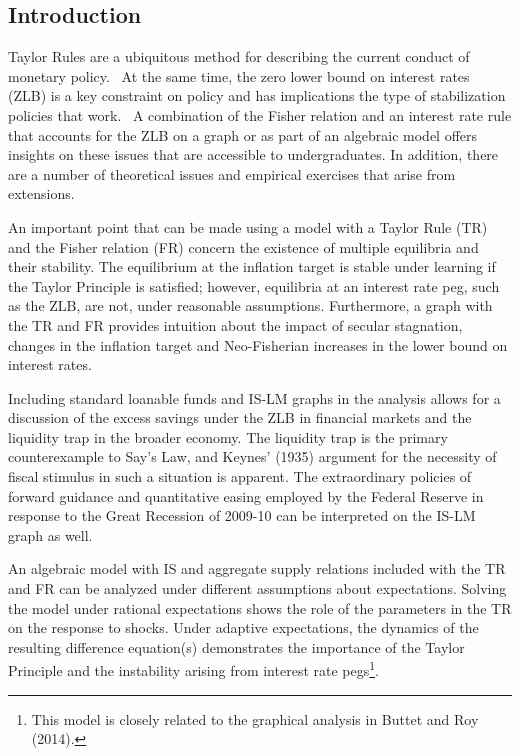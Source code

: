 \documentclass{article}
\begin{document}
\begin{doublespace}
\pagebreak

\section{Introduction}

Taylor Rules are a ubiquitous method for describing the current conduct of
monetary policy. \ At the same time, the zero lower bound on interest rates
(ZLB) is a key constraint on policy and has implications the type of
stabilization policies that work. \ A combination of the Fisher relation and
an interest rate rule that accounts for the ZLB on a graph or as part of an
algebraic model offers insights on these issues that are accessible to
undergraduates. In addition, there are a number of theoretical issues and
empirical exercises that arise from extensions.

An important point that can be made using a model with a Taylor Rule (TR)
and the Fisher relation (FR) concern the existence of multiple equilibria
and their stability. The equilibrium at the inflation target is stable under
learning if the Taylor Principle is satisfied; however, equilibria at an
interest rate peg, such as the ZLB, are not, under reasonable assumptions.
Furthermore, a graph with the TR and FR provides intuition about the impact
of secular stagnation, changes in the inflation target and Neo-Fisherian
increases in the lower bound on interest rates.

Including standard loanable funds and IS-LM graphs in the analysis allows
for a discussion of the excess savings under the ZLB in financial markets
and the liquidity trap in the broader economy. The liquidity trap is the
primary counterexample to Say's Law, and Keynes' (1935) argument for the
necessity of fiscal stimulus in such a situation is apparent. The
extraordinary policies of forward guidance and quantitative easing employed
by the Federal Reserve in response to the Great Recession of 2009-10 can be
interpreted on the IS-LM graph as well.

An algebraic model with IS and aggregate supply relations included with the
TR and FR can be analyzed under different assumptions about expectations.
Solving the model under rational expectations shows the role of the
parameters in the TR on the response to shocks. Under adaptive expectations,
the dynamics of the resulting difference equation(s) demonstrates the
importance of the Taylor Principle and the instability arising from interest
rate pegs\footnote{%
This model is closely related to the graphical analysis in Buttet and Roy
(2014).}.


\end{doublespace}
\end{document}
